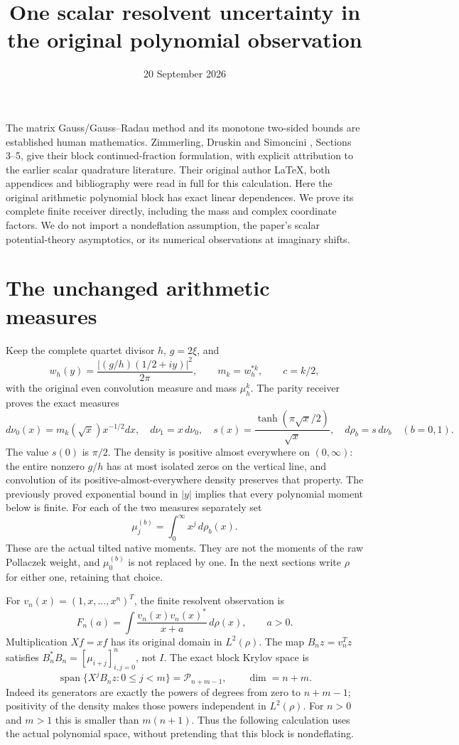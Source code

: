 \documentclass[11pt]{article}
\title{One scalar resolvent uncertainty in the original polynomial observation}
\author{}
\date{20 September 2026}
\begin{document}
\maketitle
The matrix Gauss/Gauss--Radau method and its monotone two-sided bounds
are established human mathematics. Zimmerling, Druskin and Simoncini
\cite{ZDS}, Sections 3--5, give their block continued-fraction formulation,
with explicit attribution to the earlier scalar quadrature literature.
Their original author LaTeX, both appendices and bibliography were read
in full for this calculation. Here the original arithmetic polynomial
block has exact linear dependences. We prove its complete finite receiver
directly, including the mass and complex coordinate factors. We do not
import a nondeflation assumption, the paper's scalar potential-theory
asymptotics, or its numerical observations at imaginary shifts.

\section{The unchanged arithmetic measures}
Keep the complete quartet divisor $h$, $g=2\xi$, and
\[
 w_h(y)=\frac{|(g/h)(1/2+iy)|^2}{2\pi},\qquad
 m_k=w_h^{*k},\qquad c=k/2,
\]
with the original even convolution measure and mass $\mu_h^k$.
The parity receiver \cite{PP} proves the exact measures
\[
 d\nu_0(x)=m_k(\sqrt x)x^{-1/2}dx,\quad d\nu_1=x\,d\nu_0,
 \quad s(x)=\frac{\tanh(\pi\sqrt x/2)}{\sqrt x},\quad
 d\rho_b=s\,d\nu_b\quad(b=0,1).
\]
The value $s(0)$ is $\pi/2$. The density is positive almost everywhere
on $(0,\infty)$: the entire nonzero $g/h$ has at most isolated zeros
on the vertical line, and convolution of its positive-almost-everywhere
density preserves that property. The previously proved exponential
bound in $|y|$ implies that every polynomial moment below is finite.
For each of the two measures separately set
\[
 \mu_j^{(b)}=\int_0^\infty x^j\,d\rho_b(x).
\]
These are the actual tilted native moments. They are not the moments
of the raw Pollaczek weight, and $\mu_0^{(b)}$ is not replaced by one.
In the next sections write $\rho$ for either one, retaining that choice.

For $v_n(x)=(1,x,\ldots,x^n)^T$, the finite resolvent observation is
\begin{equation}\tag{RR1}\label{eq:F}
 F_n(a)=\int\frac{v_n(x)v_n(x)^*}{x+a}\,d\rho(x),\qquad a>0.
\end{equation}
Multiplication $Xf=xf$ has its original domain in $L^2(\rho)$.
The map $B_nz=v_n^Tz$ satisfies
$B_n^*B_n=[\mu_{i+j}]_{i,j=0}^n$, not $I$.
The exact block Krylov space is
\begin{equation}\tag{RR2}\label{eq:deflation}
 \operatorname{span}\{X^jB_nz:0\le j<m\}
       =\mathcal P_{n+m-1},\qquad\dim=n+m.
\end{equation}
Indeed its generators are exactly the powers of degrees from zero
to $n+m-1$; positivity of the density makes those powers independent
in $L^2(\rho)$. For $n>0$ and $m>1$ this is smaller than $m(n+1)$.
Thus the following calculation uses the actual polynomial space,
without pretending that this block is nondeflating.
\end{document}
